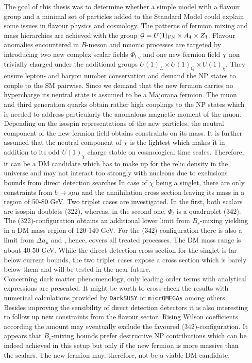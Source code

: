 The goal of this thesis was to determine whether a simple model with a flavour group and a minimal set of particles added to the Standard Model 
could explain some issues in flavour physics and cosmology. The patterns of fermion mixing and mass hierarchies are achieved with the group
$\mathcal{G} = U(1)_\text{FN}\times A_4 \times Z_3$. Flavour anomalies encountered in $B$-meson and muonic processes are targeted by introducing two new complex 
scalar fields $\Phi_{l,q}$
and one new fermion field $\chi$ non trivially charged under the additional groups $U(1)_L\times U(1)_Q\times U(1)_\chi$. They ensure lepton- and baryon number
conservation and demand the NP states to couple to the SM pairwise. Since we demand that the new fermion carries no hypercharge its neutral state is 
assumed to be a Majorana fermion. The muon and third generation quarks obtain rather high couplings to the NP states which is needed to address 
particularly the anomalous magnetic moment of the muon. Depending on the isospin representations of the new particles, the neutral component of the 
new fermion field obtains constraints on its mass. It is further assumed that the neutral component of $\chi$ is the lightest which makes it in
addition to its odd $U(1)_\chi$ charge stable on cosmological time scales. Therefore, it can be a DM candidate which has to make up for the 
relic density in the universe and may not interact too strongly with nucleons due to exclusions bounds from direct detection searches
In case of $\chi$ being a singlet, there are only constraints from $b\rightarrow s\mu\mu$ and the annihilation cross section leaving its mass
in a region of 50-80 GeV. Two triplet cases are investigated. In the first, both scalars are isospin doublets (322), whereas, in the second one,
$\Phi_l$ is a quadruplet (342). The (322)-configuration obtains an additional lower limit from $B_s$-mixing yielding in a DM mass region of
120-140 GeV. For the (342)-configuration there is also a limit from $\Delta a_\mu$ and , hence, covers all treated processes. The DM mass range
is about 40-50 GeV. While the direct detection cross section for the singlet is far below current bounds, the two triplet cases expose a cross section
which is barely below them and will be tested in the near future.\\
\noindent  Concerning dark matter phenomenology, only leading order
terms with analytical expressions are presented. It might be worth to cross-check the results with numerical calculations provided by 
\texttt{DarkSUSY} \cite{0406204} or \texttt{micrOMEGAs} \cite{1005.4133} among others. 
Besides improving the sensibility of direct detection detectors it is also interesting to follow up new constraints from the flavour 
sector. Rising Wilson coefficients according the amount may eventually exclude the favoured (342)-configuration. It appears that $B_s$-mixing bounds
prefer destructive NP contributions which can be indeed achieved in this setup but only if the new fermion is more massive than the scalars. The 
new fermion may, therefore, not be a viable DM candidate. 

